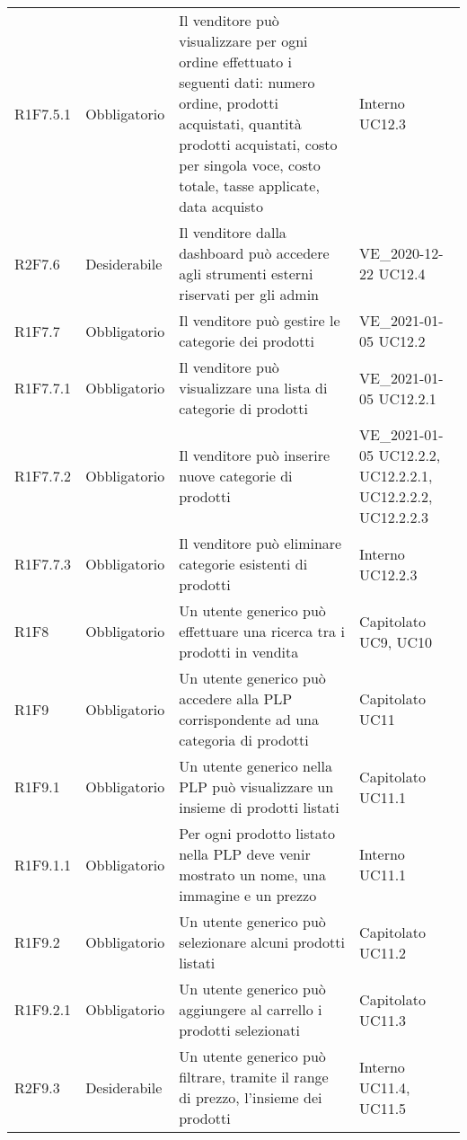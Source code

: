 {\begin{longtable}{C{2.5cm} C{2.8cm} C{6.7cm} C{2.5cm}}
R1F7.5.1 & Obbligatorio & Il venditore può visualizzare per ogni ordine effettuato i seguenti dati: numero ordine, prodotti acquistati, quantità prodotti acquistati, costo per singola voce, costo totale, tasse applicate, data acquisto & Interno \newline UC12.3\\
R2F7.6 & Desiderabile & Il venditore dalla dashboard può accedere agli strumenti esterni riservati per gli admin & VE\_2020-12-22 \newline UC12.4\\
R1F7.7 & Obbligatorio & Il venditore può gestire le categorie dei prodotti & VE\_2021-01-05 \newline UC12.2\\
R1F7.7.1 & Obbligatorio & Il venditore può visualizzare una lista di categorie di prodotti & VE\_2021-01-05 \newline UC12.2.1\\
R1F7.7.2 & Obbligatorio & Il venditore può inserire nuove categorie di prodotti & VE\_2021-01-05 \newline UC12.2.2, UC12.2.2.1, UC12.2.2.2, UC12.2.2.3\\
R1F7.7.3 & Obbligatorio & Il venditore può eliminare categorie esistenti di prodotti & Interno \newline UC12.2.3\\


R1F8 & Obbligatorio & Un utente generico può effettuare una ricerca tra i prodotti in vendita & Capitolato \newline UC9, UC10\\


R1F9 & Obbligatorio & Un utente generico può accedere alla PLP corrispondente ad una categoria di prodotti & Capitolato \newline UC11 \\
R1F9.1 & Obbligatorio & Un utente generico nella PLP può visualizzare un insieme di prodotti listati & Capitolato \newline UC11.1\\
R1F9.1.1 & Obbligatorio & Per ogni prodotto listato nella PLP deve venir mostrato un nome, una immagine e un prezzo & Interno \newline UC11.1\\
R1F9.2 & Obbligatorio & Un utente generico può selezionare alcuni prodotti listati & Capitolato \newline UC11.2\\
R1F9.2.1 & Obbligatorio & Un utente generico può aggiungere al carrello i prodotti selezionati & Capitolato \newline UC11.3\\
R2F9.3 & Desiderabile & Un utente generico può filtrare, tramite il range di prezzo, l'insieme dei prodotti & Interno \newline UC11.4, UC11.5\\


\end{longtable}}
